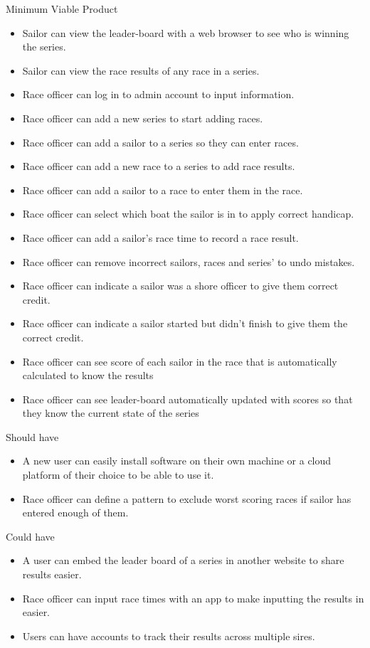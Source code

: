 \documentclass{l4proj}
\begin{document}
Minimum Viable Product
\begin{itemize}
    \item
    Sailor can view the leader-board with a web browser to see who is winning the series.
    \item
    Sailor can view the race results of any race in a series.
    \item
    Race officer can log in to admin account to input information.
    \item
    Race officer can add a new series to start adding races.
    \item
    Race officer can add a sailor to a series so they can enter races.
    \item
    Race officer can add a new race to a series to add race results.
    \item
    Race officer can add a sailor to a race to enter them in the race.
    \item
    Race officer can select which boat the sailor is in to apply
    correct handicap.
    \item
    Race officer can add a sailor’s race time to record a race result.
    \item
    Race officer can remove incorrect sailors, races and series’ to undo mistakes.
    \item
    Race officer can indicate a sailor was a shore officer to give them correct credit.
    \item
    Race officer can indicate a sailor started but didn't finish to give them the correct credit.
    \item
    Race officer can see score of each sailor in the race that is automatically calculated to know the results
    \item
    Race officer can see leader-board automatically updated with scores so that they know the current state of the series
\end{itemize}

Should have

\begin{itemize}
    \item
    A new user can easily install software on their own machine or a cloud platform of their choice to be able to use it.
    \item
    Race officer can define a pattern to exclude worst scoring races if sailor has entered enough of them.
\end{itemize}

Could have
\begin{itemize}
    \item
    A user can embed the leader board of a series in another website to share results easier.
    \item
    Race officer can input race times with an app to make inputting the results in easier.
    \item
    Users can have accounts to track their results across multiple sires.
\end{itemize}
\end{document}
